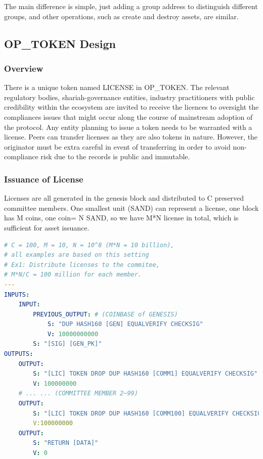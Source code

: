 \documentclass[a4paper,11pt]{article}
\begin{document}
The main difference is simple, just adding a group address to distinguish different groups, and other operations, such as create and destroy assets, are similar.


\subsection{OP\_TOKEN Design}

\subsubsection{Overview}

There is a unique token named LICENSE in OP\_TOKEN. The relevant regulatory bodies, shariah-governance entities, industry practitioners with public credibility within the ecosystem are invited to receive the licences to oversight the compliances issues that might occur along the course of mainstream adoption of the protocol. Any entity planning to issue a token needs to be warranted with a license. Peers can transfer licenses as they are also tokens in nature. However, the originator must be extra careful in event of transferring in order to avoid non-compliance risk due to the records is public and immutable.  
 

\subsubsection{Issuance of License}

Licenses are all generated in the genesis block and distributed to C preserved committee members. One smallest unit (SAND) can represent a license, one block has M coins, one coin= N SAND, so we have M*N license in total, which is sufficient for asset issuance.


\begin{lstlisting}[language=yaml, numbers=none,basicstyle=\footnotesize]
# C = 100, M = 10, N = 10^8 (M*N = 10 billion),
# all examples are based on this setting
# Ex1: Distribute licenses to the commitee,
# M*N/C = 100 million for each member.
---
INPUTS:
	INPUT:
		PREVIOUS_OUTPUT: # (COINBASE of GENESIS)
			S: "DUP HASH160 [GEN] EQUALVERIFY CHECKSIG"
			V: 10000000000
		S: "[SIG] [GEN_PK]"
OUTPUTS:
	OUTPUT:
		S: "[LIC] TOKEN DROP DUP HASH160 [COMM1] EQUALVERIFY CHECKSIG"
		V: 100000000
	# ... ... (COMMITTEE MEMBER 2~99)
	OUTPUT:
		S: "[LIC] TOKEN DROP DUP HASH160 [COMM100] EQUALVERIFY CHECKSIG"
		V:100000000
	OUTPUT:
		S: "RETURN [DATA]"
		V: 0
\end{lstlisting}
\end{document}
